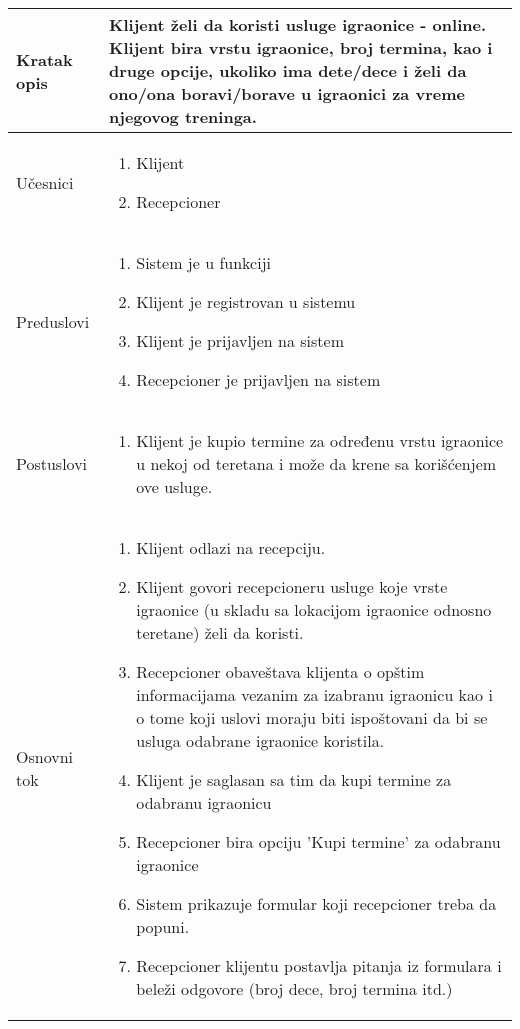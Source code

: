 \documentclass[../../main.tex]{subfiles}
\begin{document}
\begin{longtable}{| p{} | p{} |} 
\hline
    Kratak opis & Klijent želi da koristi usluge igraonice - online. Klijent bira vrstu igraonice, broj termina, kao i druge opcije, ukoliko ima dete/dece i želi da ono/ona boravi/borave u igraonici za vreme njegovog treninga.  \\ 
\hline
    Učesnici &
    \begin{enumerate}
        \item Klijent
        \item Recepcioner
    \end{enumerate}\\
\hline
   Preduslovi &
    \begin{enumerate}
        \item Sistem je u funkciji
        \item Klijent je registrovan u sistemu
        \item Klijent je prijavljen na sistem
        \item Recepcioner je prijavljen na sistem
    \end{enumerate}\\
\hline  
    Postuslovi & 
    \begin{enumerate}
         \item Klijent je kupio termine za određenu vrstu igraonice u nekoj od teretana i može da krene sa korišćenjem ove usluge.
    \end{enumerate} \\
\hline
    Osnovni tok & 
    \begin{enumerate}
        \item Klijent odlazi na recepciju.
        \item Klijent govori recepcioneru usluge koje vrste igraonice (u skladu sa lokacijom igraonice odnosno teretane) želi da koristi.
        \item Recepcioner obaveštava klijenta o opštim informacijama vezanim za izabranu igraonicu kao i o tome koji uslovi moraju biti ispoštovani da bi se usluga odabrane igraonice koristila.
        \item Klijent je saglasan sa tim da kupi termine za odabranu igraonicu
        \item Recepcioner bira opciju 'Kupi termine' za odabranu igraonice
        \item Sistem prikazuje formular koji recepcioner treba da popuni.
        \item Recepcioner klijentu postavlja pitanja iz formulara i beleži odgovore (broj dece, broj termina itd.)

\end{enumerate}
\end{longtable}
\end{document}
